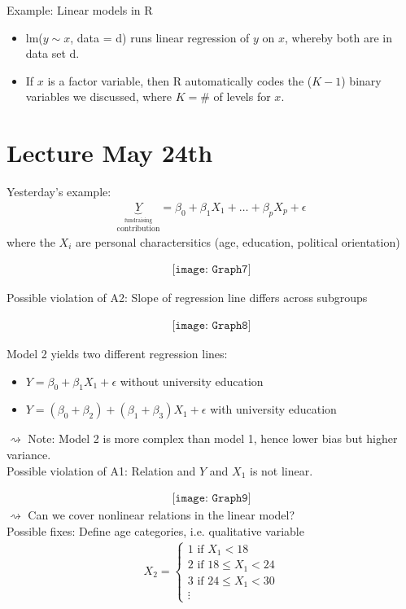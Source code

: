 \documentclass[11pt,a4paper,numbers=endperiod]{scrartcl}
\newcommand{\id}{\hspace*{4mm}}
\begin{document}
{Example: Linear models in R \begin{itemize}
	\item lm($y \sim x$, data = d) runs linear regression of $y$ on $x$, whereby both are in data set d.
	\item If $x$ is a factor variable, then R automatically codes the ($K-1$) binary variables we discussed, where $K = \#$ of levels for $x$.
\end{itemize}

\section{Lecture May 24th}

Yesterday's example: \begin{align*}
	\underbrace{Y}_{\stackrel{\text{fundraising}}{\text{contribution}}} = \beta_0 + \beta_1X_1 + \ldots + \beta_pX_p + \epsilon
\end{align*}
where the $X_i$ are personal charactersitics (age, education, political orientation)

\begin{align*}
	\texttt{[image: Graph7]}
\end{align*}

Possible violation of A2: Slope of regression line differs across subgroups

\begin{align*}
	\texttt{[image: Graph8]}
\end{align*}

Model 2 yields two different regression lines: \begin{itemize}
	\item $Y = \beta_0 + \beta_1 X_1 + \epsilon$ \id \id \id \id \id without university education
	\item $Y = (\beta_0 + \beta_2) + (\beta_1 + \beta_3)X_1 + \epsilon$ \id with university education
\end{itemize}
$\rightsquigarrow$ Note: Model 2 is more complex than model 1, hence lower bias but higher variance.\\
Possible violation of A1: Relation and $Y$ and $X_1$ is not linear. 

\begin{align*}
	\texttt{[image: Graph9]}
\end{align*}
$\rightsquigarrow$ Can we cover nonlinear relations in the linear model?\\
Possible fixes: Define age categories, i.e. qualitative variable \begin{align*}
	X_2 = \begin{cases}
	1 \text{ if } X_1 < 18\\
	2 \text{ if } 18 \leq X_1 < 24\\
	3 \text{ if } 24 \leq X_1 < 30\\
	\vdots
	\end{cases}
\end{align*}

}
\end{document}
